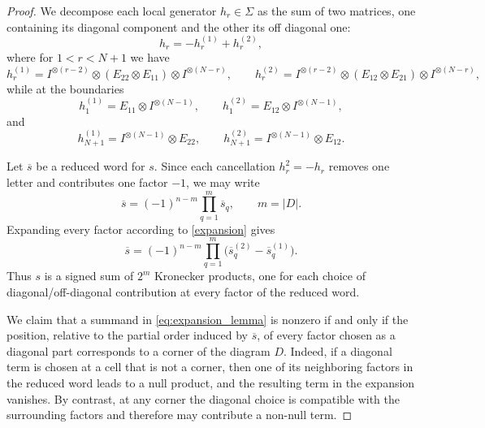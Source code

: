 \documentclass[10pt,a4paper]{amsart}
\begin{document}
\begin{proof}

We decompose each local generator $h_r\in\Sigma$ as the sum of two matrices, one containing its diagonal component and the other its off diagonal one:
\begin{equation}
    \label{expansion}
    h_r=-h_r^{(1)}+h_r^{(2)},
\end{equation}
where for $1<r<N+1$ we have
\[
h_r^{(1)}=I^{\otimes (r-2)}\otimes(E_{22}\otimes E_{11})\otimes I^{\otimes (N-r)},
\qquad
h_r^{(2)}=I^{\otimes (r-2)}\otimes(E_{12}\otimes E_{21})\otimes I^{\otimes (N-r)},
\]
while at the boundaries
\[
h_{1}^{(1)}=E_{11}\otimes I^{\otimes (N-1)},\qquad
h_{1}^{(2)}=E_{12}\otimes I^{\otimes (N-1)},
\]
and
\[
h_{N+1}^{(1)}=I^{\otimes (N-1)}\otimes E_{22},\qquad
h_{N+1}^{(2)}=I^{\otimes (N-1)}\otimes E_{12}.
\]

Let $\overline{s}$ be a reduced word for $s$. Since each cancellation $h_r^2=-h_r$ removes one letter and contributes one factor $-1$, we may write
\[
\overline{s}=(-1)^{n-m}\prod_{q=1}^{m}\overline{s}_q,
\qquad m=|D|.
\]
Expanding every factor according to \eqref{expansion} gives
\begin{equation}
\label{eq:expansion_lemma}
\overline{s}=(-1)^{n-m}\prod_{q=1}^{m}\bigl(\overline{s}_q^{(2)}-\overline{s}_q^{(1)}\bigr).
\end{equation}
Thus $s$ is a signed sum of $2^m$ Kronecker products, one for each choice of diagonal/off-diagonal contribution at every factor of the reduced word.

We claim that a summand in \eqref{eq:expansion_lemma} is nonzero if and only if the position, relative to the partial order induced by $\overline{s}$, of every factor chosen as a diagonal part corresponds to a corner of the diagram $D$. Indeed, if a diagonal term is chosen at a cell that is not a corner, then one of its neighboring factors in the reduced word leads to a null product, and the resulting term in the expansion vanishes. By contrast, at any corner the diagonal choice is compatible with the surrounding factors and therefore may contribute a non-null term.


\end{proof}
\end{document}

